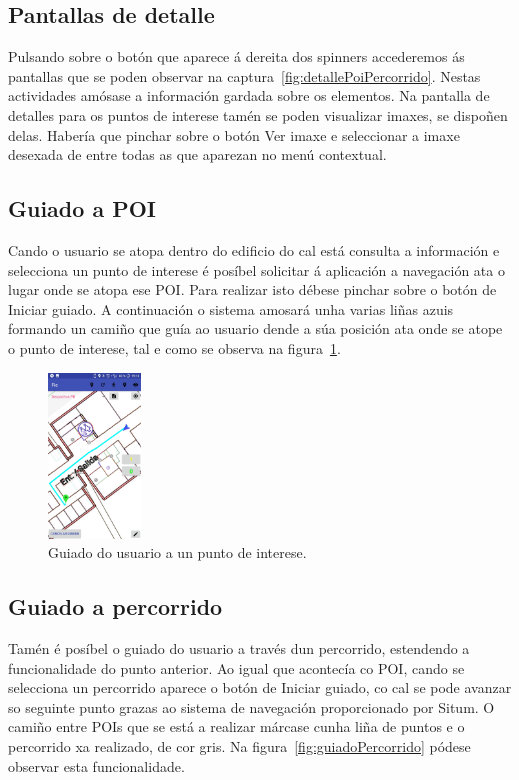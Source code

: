 \subsection{Pantallas de detalle}
Pulsando sobre o botón que aparece á dereita dos spinners accederemos ás pantallas que se poden observar na captura~\ref{fig:detallePoiPercorrido}. Nestas actividades amósase a información gardada sobre os elementos. Na pantalla de detalles para os puntos de interese tamén se poden visualizar imaxes, se dispoñen delas. Habería que pinchar sobre o botón Ver imaxe e seleccionar a imaxe desexada de entre todas as que aparezan no menú contextual.

\subsection{Guiado a POI}
Cando o usuario se atopa dentro do edificio do cal está consulta a información e selecciona un punto de interese é posíbel solicitar á aplicación a navegación ata o lugar onde se atopa ese POI. Para realizar isto débese pinchar sobre o botón de Iniciar guiado. A continuación o sistema amosará unha varias liñas azuis formando un camiño que guía ao usuario dende a súa posición ata onde se atope o punto de interese, tal e como se observa na figura~\ref{fig:guiadoPOI}.

\begin{figure}[H]
	\begin{center}
		\includegraphics[width=0.22\textwidth]{figures/android/guiadoPOI}
		\caption{Guiado do usuario a un punto de interese.}
		\label{fig:guiadoPOI}
	\end{center}
\end{figure}

\subsection{Guiado a percorrido}
Tamén é posíbel o guiado do usuario a través dun percorrido, estendendo a funcionalidade do punto anterior. Ao igual que acontecía co POI, cando se selecciona un percorrido aparece o botón de Iniciar guiado, co cal se pode avanzar so seguinte punto grazas ao sistema de navegación proporcionado por Situm. O camiño entre POIs que se está a realizar márcase cunha liña de puntos e o percorrido xa realizado, de cor gris. Na figura~\ref{fig:guiadoPercorrido} pódese observar esta funcionalidade.

